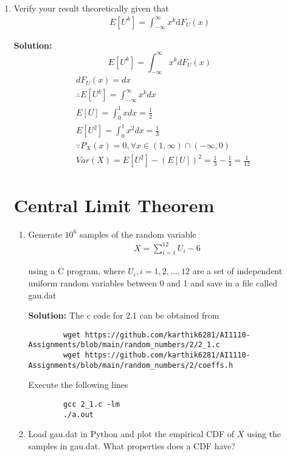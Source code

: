 \documentclass[journal,12pt,twocolumn]{IEEEtran}
\newcommand{\solution}{\noindent \textbf{Solution: }}
\providecommand{\sbrak}[1]{\ensuremath{\left[#1\right]}}
\providecommand{\mean}[1]{E\left[ #1 \right]}
\numberwithin{equation}{section}
\renewcommand\thesection{\arabic{section}}
\begin{document}
\begin{enumerate}[label=\thesection.\arabic*,ref=\thesection.\theenumi]
	\item Verify your result theoretically given that
	\begin{align}
		\mean{U^k} = \int_{-\infty}^{\infty}x^k \mathrm{d}F_{U}(x)
	\end{align}
		
	\solution 
		\begin{equation}
E\sbrak{U^k} = \int_{-\infty}^{\infty}x^kdF_{U}(x)
\end{equation}
\begin{align}
&dF_{U}(x)=dx\\
&\therefore E[U^k]=\int_{-\infty}^{\infty} x^k dx\\
&E[U]=\int_{0}^{1} x dx=\frac{1}{2}\\
&E[U^2]=\int_{0}^{1} x^2 dx=\frac{1}{3}\\
&\because P_{X}(x)=0 ,\forall x \in (1,\infty)\cap (-\infty,0)\\
&Var(X)=E[U^2]-(E[U])^2=\frac{1}{3}-\frac{1}{4}=\frac{1}{12}
\end{align}
	
	\section{Central Limit Theorem}

	\begin{enumerate}[label=\thesection.\arabic*,ref=\thesection.\theenumi]
	\item Generate $10^6$ samples of the random variable
	\begin{align}
		X = \sum_{i=1}^{12}U_i -6
	\end{align}

	using a C program, where $U_i, i = 1,2,\dots, 12$ are  a set of independent uniform random variables between 0 and 1 and save in a file called gau.dat
	
	\solution The c code for 2.1 can be obtained from
	\begin{lstlisting}
		wget https://github.com/karthik6281/AI1110-Assignments/blob/main/random_numbers/2/2_1.c
		wget https://github.com/karthik6281/AI1110-Assignments/blob/main/random_numbers/2/coeffs.h
	\end{lstlisting}
	Execute the following lines
	\begin{lstlisting}
		gcc 2_1.c -lm
		./a.out
	\end{lstlisting}
		
	\item Load gau.dat in Python and plot the empirical CDF of $X$ using the samples in gau.dat. What properties does a CDF have?


\end{enumerate}
\end{enumerate}
\end{document}
